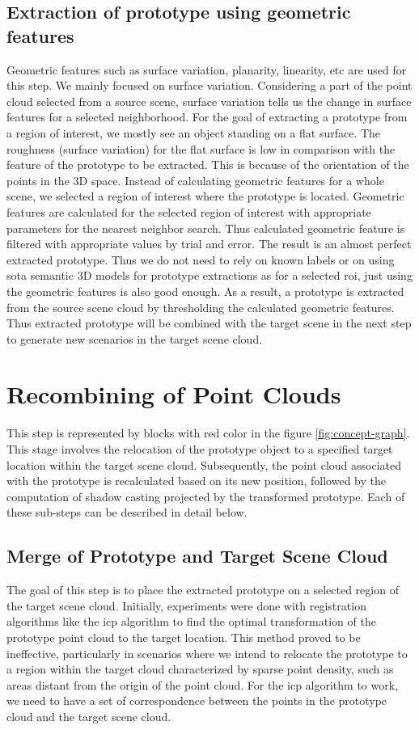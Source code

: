 \subsection{Extraction of prototype using geometric features}
Geometric features such as surface variation, planarity, linearity, etc are used for this step. We mainly focused on surface variation. Considering a part of the point cloud selected from a source scene, surface variation tells us the change in surface features for a selected neighborhood. For the goal of extracting a prototype from a region of interest, we mostly see an object standing on a flat surface. The roughness (surface variation) for the flat surface is low in comparison with the feature of the prototype to be extracted. This is because of the orientation of the points in the 3D space. Instead of calculating geometric features for a whole scene, we selected a region of interest where the prototype is located. Geometric features are calculated for the selected region of interest with appropriate parameters for the nearest neighbor search. Thus calculated geometric feature is filtered with appropriate values by trial and error. The result is an almost perfect extracted prototype. Thus we do not need to rely on known labels or on using \acrshort{sota} semantic 3D models for prototype extractions as for a selected \acrfull{roi}, just using the geometric features is also good enough. As a result, a prototype is extracted from the source scene cloud by thresholding the calculated geometric features. Thus extracted prototype will be combined with the target scene in the next step to generate new scenarios in the target scene cloud.

\section{Recombining of Point Clouds}
This step is represented by blocks with red color in the figure \ref{fig:concept-graph}. This stage involves the relocation of the prototype object to a specified target location within the target scene cloud. Subsequently, the point cloud associated with the prototype is recalculated based on its new position, followed by the computation of shadow casting projected by the transformed prototype. Each of these sub-steps can be described in detail below.

\subsection{Merge of Prototype and Target Scene Cloud}
The goal of this step is to place the extracted prototype on a selected region of the target scene cloud. Initially, experiments were done with registration algorithms like the \acrfull{icp} algorithm to find the optimal transformation of the prototype point cloud to the target location. This method proved to be ineffective, particularly in scenarios where we intend to relocate the prototype to a region within the target cloud characterized by sparse point density, such as areas distant from the origin of the point cloud. For the \acrshort{icp} algorithm to work, we need to have a set of correspondence between the points in the prototype cloud and the target scene cloud. 

